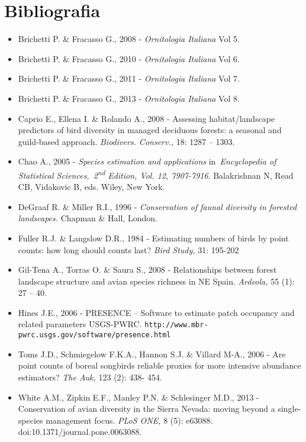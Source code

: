 \section*{Bibliografia}
\begin{itemize}\itemsep0pt
	\item Brichetti P. \& Fracasso G., 2008 - \textit{Ornitologia Italiana} Vol
5.
	\item Brichetti P. \& Fracasso G., 2010 - \textit{Ornitologia Italiana} Vol
6.
	\item Brichetti P. \& Fracasso G., 2011 - \textit{Ornitologia Italiana }Vol
7.
	\item Brichetti P. \& Fracasso G., 2013 - \textit{Ornitologia Italiana} Vol
8.
	\item Caprio E., Ellena I. \& Rolando A., 2008 - Assessing habitat/landscape
predictors of bird diversity in managed deciduous forests: a seasonal
and guild-based approach. \textit{Biodivers. Conserv., }18: 1287 --
1303.
	\item Chao A., 2005 - \textit{Species estimation and applications}
in~\textit{Encyclopedia of Statistical
Sciences,~2}\textit{\textsuperscript{nd}}\textit{ Edition, Vol. 12,
7907-7916}. Balakrishnan N, Read CB, Vidakovic B, eds. Wiley, New
York.
	\item DeGraaf R. \& Miller R.I., 1996 - \textit{Conservation of faunal
diversity in forested landscapes. }Chapman \& Hall, London.
	\item Fuller R.J. \& Langslow D.R., 1984 - Estimating numbers of birds by
point counts: how long should counts last? \textit{Bird Study,} 31:
195-202
	\item Gil-Tena A., Torras O. \& Saura S., 2008 - Relationships between forest
landscape structure and avian species richness in NE Spain.
\textit{Ardeola, }55 (1): 27 -- 40.
	\item Hines J.E., 2006 - PRESENCE -- Software to estimate patch occupancy and
related parameters USGS-PWRC. \texttt{http://www.mbr-pwrc.usgs.gov/software/presence.html}
	\item Toms J.D.,	 Schmiegelow F.K.A., Hannon S.J. \& Villard M-A., 2006 - Are
point counts of boreal songbirds reliable proxies for more intensive
abundance estimators? \textit{The Auk, }123 (2): 438- 454.
	\item White A.M., Zipkin E.F., Manley P.N. \& Schlesinger M.D., 2013 -
Conservation of avian diversity in the Sierra Nevada: moving beyond a
single-species management focus. \textit{PLoS ONE, }8 (5): e63088.
doi:10.1371/journal.pone.0063088.
\end{itemize}
